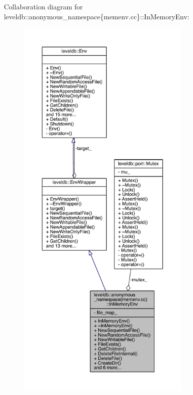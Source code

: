 Collaboration diagram for leveldb\+:\+:anonymous\+\_\+namespace\{memenv.\+cc\}\+:\+:In\+Memory\+Env\+:
\nopagebreak
\begin{figure}[H]
\begin{center}
\leavevmode
\includegraphics[height=550pt]{classleveldb_1_1anonymous__namespace_02memenv_8cc_03_1_1_in_memory_env__coll__graph}
\end{center}
\end{figure}
